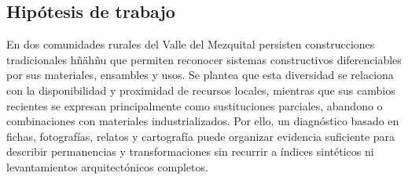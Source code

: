 \subsection{Hipótesis de trabajo}

En dos comunidades rurales del Valle del Mezquital persisten construcciones tradicionales hñähñu que permiten reconocer sistemas constructivos diferenciables por sus materiales, ensambles y usos. Se plantea que esta diversidad se relaciona con la disponibilidad y proximidad de recursos locales, mientras que sus cambios recientes se expresan principalmente como sustituciones parciales, abandono o combinaciones con materiales industrializados. Por ello, un diagnóstico basado en fichas, fotografías, relatos y cartografía puede organizar evidencia suficiente para describir permanencias y transformaciones sin recurrir a índices sintéticos ni levantamientos arquitectónicos completos.
